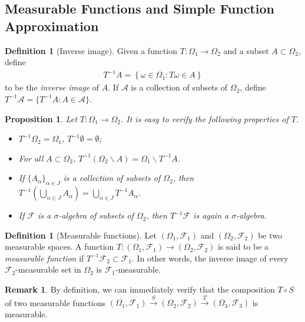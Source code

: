 \documentclass{article}
\numberwithin{equation}{section}
\theoremstyle{plain}
\newtheorem{proposition}[theorem]{Proposition}
\theoremstyle{definition}
\newtheorem{definition}[theorem]{Definition}
\newtheorem*{remark}{Remark}
\begin{document}
\subsection{Measurable Functions and Simple Function Approximation}
\begin{definition}[Inverse image]\label{def:1.26} Given a function $T:\Omega_1\to\Omega_2$ and a subset $A\subset\Omega_2$, define
\begin{align*}
	T^{-1}A=\left\{\omega\in\Omega_1:T\omega\in A\right\}
\end{align*}
to be the \textit{inverse image} of $A$. If $\mathscr{A}$ is a collection of subsets of $\Omega_2$, define $T^{-1}\mathscr{A}=\{T^{-1}A:A\in\mathscr{A}\}$. 
\end{definition}
\begin{proposition}\label{prop:1.27} Let $T:\Omega_1\to\Omega_2$. It is easy to verify the following properties of $T$.
\begin{itemize}
	\item[(i)] $T^{-1}\Omega_2=\Omega_1$, $T^{-1}\emptyset=\emptyset$;
	\item[(ii)] For all $A\subset\Omega_2$, $T^{-1}(\Omega_2\backslash A)=\Omega_1\backslash T^{-1}A$.
	\item[(iii)] If $\{A_\alpha\}_{\alpha\in J}$ is a collection of subsets of $\Omega_2$, then $T^{-1}\left(\bigcup_{\alpha\in J}A_\alpha\right) = \bigcup_{\alpha\in J}T^{-1}A_\alpha$.
	\item[(iv)] If $\mathscr{F}$ is a $\sigma$-algebra of subsets of $\Omega_2$, then $T^{-1}\mathscr{F}$ is again a $\sigma$-algebra.
\end{itemize}
\end{proposition}

\begin{definition}[Measurable functions]\label{def:1.28} 
Let $(\Omega_1,\mathscr{F}_1)$ and $(\Omega_2,\mathscr{F}_2)$ be two measurable spaces. A function $T:(\Omega_1,\mathscr{F}_1)\to(\Omega_2,\mathscr{F}_2)$ is said to be a \textit{measurable function} if $T^{-1}\mathscr{F}_2\subset\mathscr{F}_1$. In other words, the inverse image of every $\mathscr{F}_2$-measurable set in $\Omega_2$ is $\mathscr{F}_1$-measurable.
\end{definition}

\begin{remark} By definition, we can immediately verify that the composition $T\circ S$ of two measurable functions $(\Omega_1,\mathscr{F}_1)\overset{S}{\to}(\Omega_2,\mathscr{F}_2)\overset{T}{\to}(\Omega_3,\mathscr{F}_3)$ is measurable.
\end{remark}
\end{document}
